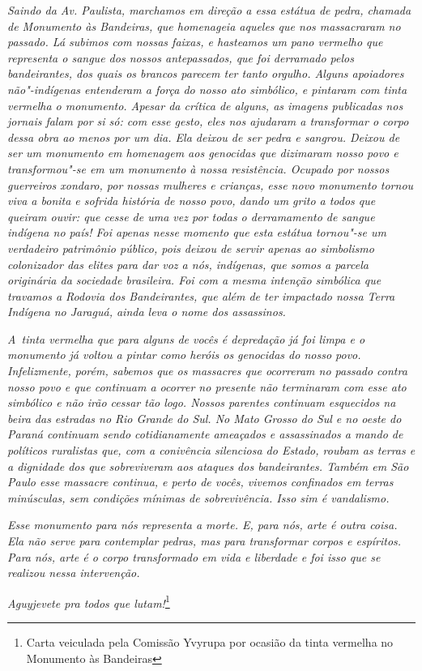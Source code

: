 \emph{Saindo da Av. Paulista, marchamos em direção a essa estátua de pedra,
chamada de Monumento às Bandeiras, que homenageia aqueles que nos
massacraram no passado. Lá subimos com nossas faixas, e hasteamos um
pano vermelho que representa o sangue dos nossos antepassados, que foi
derramado pelos bandeirantes, dos quais os brancos parecem ter tanto
orgulho. Alguns apoiadores não"-indígenas entenderam a força do nosso
ato simbólico, e pintaram com tinta vermelha o monumento. Apesar da
crítica de alguns, as imagens publicadas nos jornais falam por si só:
com esse gesto, eles nos ajudaram a transformar o corpo dessa obra ao
menos por um dia. Ela deixou de ser pedra e sangrou. Deixou de ser um
monumento em homenagem aos genocidas que dizimaram nosso povo e
transformou"-se em um monumento à nossa resistência. Ocupado por nossos
guerreiros \emph{xondaro}, por nossas mulheres e crianças, esse novo
monumento tornou viva a bonita e sofrida história de nosso povo, dando
um grito a todos que queiram ouvir: que cesse de uma vez por todas o
derramamento de sangue indígena no país! Foi apenas nesse momento que
esta estátua tornou"-se um verdadeiro patrimônio público, pois deixou de
servir apenas ao simbolismo colonizador das elites para dar voz a nós,
indígenas, que somos a parcela originária da sociedade brasileira. Foi
com a mesma intenção simbólica que travamos a Rodovia
dos Bandeirantes, que além de ter impactado nossa Terra Indígena no
Jaraguá, ainda leva o nome dos assassinos.}

\begin{samepage}
\emph{A~tinta vermelha que para alguns de vocês é depredação já foi limpa e o
monumento já voltou a pintar como heróis os genocidas do nosso povo.
Infelizmente, porém, sabemos que os massacres que ocorreram no passado
contra nosso povo e que continuam a ocorrer no presente não terminaram
com esse ato simbólico e não irão cessar tão logo. Nossos parentes
continuam esquecidos na beira das estradas no Rio Grande do Sul. No
Mato Grosso do Sul e no oeste do Paraná continuam sendo cotidianamente
ameaçados e assassinados a mando de políticos ruralistas que, com
a conivência silenciosa do Estado, roubam as terras e a dignidade dos
que sobreviveram aos ataques dos bandeirantes. Também em São Paulo esse
massacre continua, e perto de vocês, vivemos confinados em terras
minúsculas, sem condições mínimas de sobrevivência. Isso sim é
vandalismo.}

\emph{Esse monumento para nós representa a morte. E,
para nós, arte é outra coisa. Ela não serve para contemplar pedras,
mas para transformar corpos e espíritos. Para nós, arte é o corpo
transformado em vida e liberdade e foi isso que se realizou nessa
intervenção.}

\emph{Aguyjevete pra todos que lutam!}\footnote[*]{Carta veiculada pela Comissão Yvyrupa por ocasião da tinta
vermelha no Monumento às Bandeiras}
\end{samepage}

